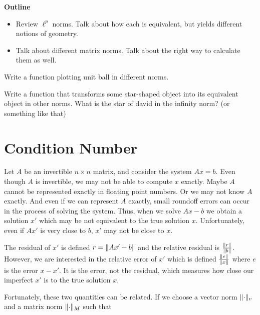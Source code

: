 \label{Ch:Norms and Geometry}


{\bf Outline}
\begin{itemize}
\item Review $\ell^p$ norms. Talk about how each is equivalent, but yields different notions of geometry.
\item Talk about different matrix norms. Talk about the right way to calculate them as well.
\end{itemize}
\begin{problem}
Write a function plotting unit ball in different norms.
\end{problem}



\begin{problem}
Write a function that transforms some star-shaped object into its equivalent object in other norms. What is the star of david in the infinity norm? (or something like that)
\end{problem}

\section*{Condition Number}

Let $A$ be an invertible $n \times n $ matrix, and consider the system $Ax = b$. Even though $A$ is invertible, we may not be able to compute $x$ exactly.  Maybe $A$ cannot be represented exactly in floating point numbers. Or we may not know $A$ exactly. And even if we can represent $A$ exactly, small roundoff errors can occur in the process of solving the system. Thus, when we solve $Ax-b$ we obtain a solution $x'$ which may be not equivalent to the true solution $x$. Unfortunately, even if $Ax'$ is very close to $b$, $x'$ may not be close to $x$. 

The residual of $x'$ is defined $r = \lVert Ax'-b\rVert$ and the relative residual is $\frac{\lVert r\rVert}{\lVert b\rVert}$. However, we are interested in the relative error of $x'$ which is defined $\frac{\lVert e\rVert}{\lVert x\rVert}$ where $e$ is the error $x-x'$. It is the error, not the residual, which measures how close our imperfect $x'$ is to the true solution $x$. 

Fortunately, these two quantities can be related. If we choose a vector norm $\lVert\cdot\rVert _v$ and a matrix norm $\lVert\cdot\rVert _M$ such that 

